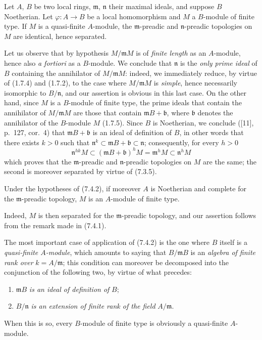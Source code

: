\begin{proposition}[7.4.2]
\label{0.7.4.2}
Let $A$, $B$ be two local rings, $\mathfrak m$, $\mathfrak n$ their maximal
ideals, and suppose $B$ Noetherian. Let $\varphi:A\to B$ be a
local homomorphism and $M$ a $B$-module of finite type. If $M$ is a quasi-finite
$A$-module, the $\mathfrak m$-preadic and $\mathfrak n$-preadic topologies
on $M$ are identical, hence separated.
\end{proposition}

Let us observe that by hypothesis $M/\mathfrak mM$ is of \emph{finite length} as
an $A$-module, hence also \emph{a fortiori} as a $B$-module. We
conclude that $\mathfrak n$ is the \emph{only prime ideal} of $B$ containing
the annihilator of $M/\mathfrak mM$: indeed, we immediately reduce, by virtue
of (1.7.4) and (1.7.2), to the case where $M/\mathfrak mM$ is \emph{simple}, hence
necessarily isomorphic to $B/\mathfrak n$, and our assertion is obvious
in this last case. On the other hand, since $M$ is a $B$-module of finite type,
the prime ideals that contain the annihilator of $M/\mathfrak mM$ are those
that contain $\mathfrak mB+\mathfrak b$, where $\mathfrak b$ denotes
the annihilator of the $B$-module $M$ (1.7.5). Since $B$ is Noetherian, we conclude
([11], p.~127, cor.~4) that $\mathfrak mB+\mathfrak b$ is an ideal
of definition of $B$, in other words that there exists $k>0$ such that
$\mathfrak n^k\subset\mathfrak mB+\mathfrak b\subset\mathfrak n$; consequently,
for every $h>0$
\[
  \mathfrak n^{hk}M
  \subset(\mathfrak mB+\mathfrak b)^hM
  =\mathfrak m^hM
  \subset\mathfrak n^hM
\]
which proves that the $\mathfrak m$-preadic and
$\mathfrak n$-preadic topologies on $M$ are the same; the second is moreover
separated by virtue of (7.3.5).

\begin{corollary}[7.4.3]
\label{0.7.4.3}
Under the hypotheses of (7.4.2), if moreover $A$ is Noetherian and complete for
the $\mathfrak m$-preadic topology, $M$ is an $A$-module of finite type.
\end{corollary}

Indeed, $M$ is then separated for the $\mathfrak m$-preadic topology, and
our assertion follows from the remark made in (7.4.1).

\begin{env}[7.4.4]
\label{0.7.4.4}
The most important case of application of (7.4.2) is the one where $B$
itself is a \emph{quasi-finite $A$-module}, which amounts to saying that
$B/\mathfrak mB$ is an \emph{algebra of finite rank over}
$k=A/\mathfrak m$; this condition can moreover be decomposed into the
conjunction of the following two, by virtue of what precedes:
\begin{enumerate}
  \item[(i)] $\mathfrak mB$ \emph{is an ideal of definition of} $B$;
  \item[(ii)] $B/\mathfrak n$ \emph{is an extension of finite rank of the field}
  $A/\mathfrak m$.
\end{enumerate}
When this is so, every $B$-module of finite type is obviously a
quasi-finite $A$-module.
\end{env}

